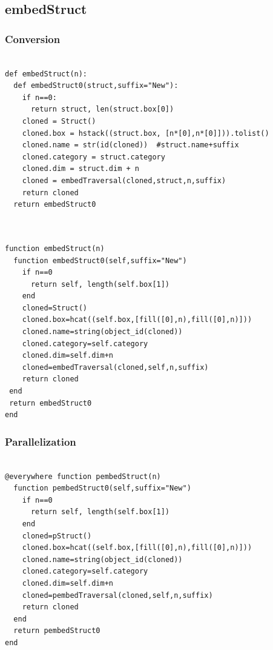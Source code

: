 \documentclass[a4paper,12pt]{article}
\begin{document}
\newpage

\subsection{embedStruct}
\subsubsection{Conversion}
\begin{Verbatim}[fontsize=\footnotesize]

def embedStruct(n):
  def embedStruct0(struct,suffix="New"):
    if n==0:
      return struct, len(struct.box[0])
    cloned = Struct()
    cloned.box = hstack((struct.box, [n*[0],n*[0]])).tolist()
    cloned.name = str(id(cloned))  #struct.name+suffix
    cloned.category = struct.category
    cloned.dim = struct.dim + n
    cloned = embedTraversal(cloned,struct,n,suffix) 
    return cloned
  return embedStruct0
  
\end{Verbatim}
\begin{Verbatim}[fontsize=\footnotesize]

function embedStruct(n)
  function embedStruct0(self,suffix="New")
    if n==0
      return self, length(self.box[1])
    end
    cloned=Struct()
    cloned.box=hcat((self.box,[fill([0],n),fill([0],n)]))
    cloned.name=string(object_id(cloned))
    cloned.category=self.category
    cloned.dim=self.dim+n
    cloned=embedTraversal(cloned,self,n,suffix)
    return cloned
 end
 return embedStruct0
end

\end{Verbatim}
\subsubsection{Parallelization}
\begin{Verbatim}[fontsize=\footnotesize]

@everywhere function pembedStruct(n)
  function pembedStruct0(self,suffix="New")
    if n==0
      return self, length(self.box[1])
    end
    cloned=pStruct()
    cloned.box=hcat((self.box,[fill([0],n),fill([0],n)]))
    cloned.name=string(object_id(cloned))
    cloned.category=self.category
    cloned.dim=self.dim+n
    cloned=pembedTraversal(cloned,self,n,suffix)
    return cloned
  end
  return pembedStruct0
end

\end{Verbatim}
\end{document}
